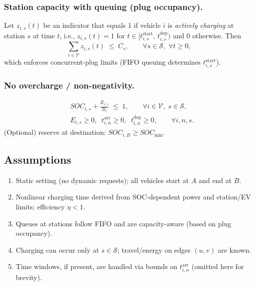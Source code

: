 \subsubsection{Station capacity with queuing (plug occupancy).}
Let $z_{i,s}(t)$ be an indicator that equals 1 if vehicle $i$ is \emph{actively charging} at station $s$ at time $t$, i.e.,
$z_{i,s}(t)=1$ for $t\in[t^{\text{start}}_{i,s},\,t^{\text{dep}}_{i,s})$ and $0$ otherwise. Then
\begin{equation*}
\sum_{i\in\mathcal{V}} z_{i,s}(t) \;\le\; C_s, \qquad \forall s\in\mathcal{S},\;\forall t\ge 0,
\end{equation*}
which enforces concurrent-plug limits (FIFO queuing determines $t^{\text{start}}_{i,s}$).

\subsubsection{No overcharge / non-negativity.}
\begin{align*}
&SOC_{i,s} + \frac{E_{i,s}}{B_i} \;\le\; 1, \qquad \forall i\in\mathcal{V},\; s\in\mathcal{S},\\
&E_{i,s}\ge 0,\;\; t^{\text{arr}}_{i,n}\ge 0,\;\; t^{\text{dep}}_{i,n}\ge 0, \qquad \forall i,n,s.
\end{align*}
(Optional) reserve at destination: $SOC_{i,B}\ge SOC_{\min}$.

\subsection{Assumptions}
\begin{enumerate}
\item Static setting (no dynamic requests); all vehicles start at $A$ and end at $B$.
\item Nonlinear charging time derived from SOC-dependent power and station/EV limits; efficiency $\eta<1$.
\item Queues at stations follow FIFO and are capacity-aware (based on plug occupancy).
\item Charging can occur only at $s\in\mathcal{S}$; travel/energy on edges $(u,v)$ are known.
\item Time windows, if present, are handled via bounds on $t^{\text{arr}}_{i,n}$ (omitted here for brevity).
\end{enumerate}

